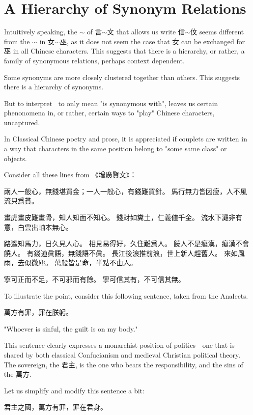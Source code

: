 \section{A Hierarchy of Synonym Relations}

Intuitively speaking, the $\sim$ of 言$\sim$文 that allows us write 信$\sim$伩 seems different from the $\sim$ in 女$\sim$巫, as it does not seem the case that 女 can be exchanged for 巫 in all Chinese characters. This suggests that there is a hierarchy, or rather, a family of synonymous relations, perhaps context dependent. 

Some synonyms are more closely clustered together than others. This suggests there is a hierarchy of synonyms.



But to interpret $~$ to only mean "is synonymous with", leaves us certain phenonomena in, or rather, certain ways to "play" Chinese characters, uncaptured. 

In Classical Chinese poetry and prose, it is appreciated if couplets are written in a way that characters in the same position belong to "some same class" or objects. 

Consider all these lines from 《增廣賢文》：


兩人一般心，無錢堪買金；一人一般心，有錢難買針。
馬行無力皆因瘦，人不風流只爲貧。

畫虎畫皮難畫骨，知人知面不知心。
錢財如糞土，仁義値千金。
流水下灘非有意，白雲出岫本無心。

路遙知馬力，日久見人心。
相見易得好，久住難爲人。
饒人不是癡漢，癡漢不會饒人。
有錢道眞語，無錢語不眞。
長江後浪推前浪，世上新人趕舊人。
來如風雨，去似微塵。
萬般皆是命，半點不由人。


寧可正而不足，不可邪而有餘。
寧可信其有，不可信其無。


To illustrate the point, consider this following sentence, taken from the Analects. 

萬方有罪，罪在朕躬。

"Whoever is sinful, the guilt is on my body."

This sentence clearly expresses a monarchist position of politics - one that is shared by both classical Confucianism and medieval Christian political theory. The sovereign, the 君主, is the one who bears the responsibility, and the sins of the 萬方.

Let us simplify and modify this sentence a bit: 

君主之國，萬方有罪，罪在君身。

